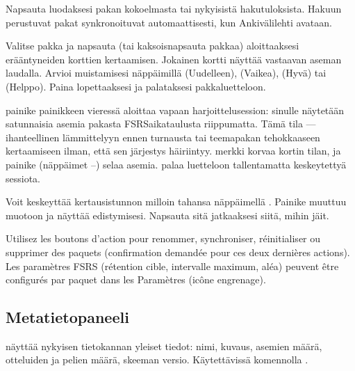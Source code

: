 \documentclass[letterpaper,10pt,finnish]{sphinxmanual}
\begin{document}
\sphinxAtStartPar
{} Napsauta  luodaksesi pakan kokoelmasta tai nykyisistä hakutuloksista. Hakuun perustuvat pakat synkronoituvat automaattisesti, kun Anki\sphinxhyphen{}välilehti avataan.

\sphinxAtStartPar
{} Valitse pakka ja napsauta  (tai kaksoisnapsauta pakkaa) aloittaaksesi erääntyneiden korttien kertaamisen. Jokainen kortti näyttää vastaavan aseman laudalla. Arvioi muistamisesi näppäimillä  (Uudelleen),  (Vaikea),  (Hyvä) tai  (Helppo). Paina  lopettaaksesi ja palataksesi pakkaluetteloon.

\sphinxAtStartPar
{} \sphinxhyphen{}painike \sphinxhyphen{}painikkeen vieressä aloittaa vapaan harjoittelusession: sinulle näytetään satunnaisia asemia pakasta FSRS\sphinxhyphen{}aikataulusta riippumatta. Tämä tila  — ihanteellinen lämmittelyyn ennen turnausta tai teemapakan tehokkaaseen kertaamiseen ilman, että sen järjestys häiriintyy. \sphinxhyphen{}merkki korvaa kortin tilan, ja \sphinxhyphen{}painike (näppäimet –) selaa asemia.  palaa luetteloon tallentamatta keskeytettyä sessiota.

\sphinxAtStartPar
{} Voit keskeyttää kertausistunnon milloin tahansa näppäimellä . Painike muuttuu muotoon  ja näyttää edistymisesi. Napsauta sitä jatkaaksesi siitä, mihin jäit.

\sphinxAtStartPar
{} Utilisez les boutons d’action pour renommer,
synchroniser, réinitialiser ou supprimer des paquets (confirmation demandée
pour ces deux dernières actions). Les paramètres FSRS (rétention cible,
intervalle maximum, aléa) peuvent être configurés par paquet dans les
Paramètres (icône engrenage).


\subsection{Metatietopaneeli}
\label{\detokenize{manuel:panneau-metadonnees}}\label{\detokenize{manuel:panneau-metadata}}
\sphinxAtStartPar
{} näyttää nykyisen tietokannan yleiset tiedot: nimi, kuvaus, asemien määrä, otteluiden ja pelien määrä, skeeman versio. Käytettävissä komennolla .
\end{document}
